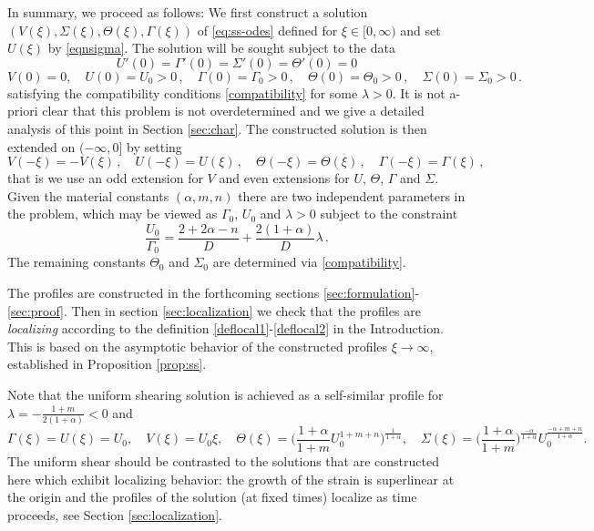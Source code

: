 \documentclass[11pt]{article}
\theoremstyle{remark}
\begin{document}
{In summary, we proceed as follows: We first construct a solution $(V(\xi) , \Sigma(\xi), \Theta(\xi), \Gamma(\xi))$
of \eqref{eq:ss-odes} defined for $\xi \in [0,\infty)$ and set $U(\xi)$ by \eqref{eqnsigma}. The solution will be
sought subject to the data
\begin{equation}
U'(0)=\Gamma'(0)=\Sigma'(0)=\Theta'(0)=0 \label{eq:bdry0}
\end{equation}
\begin{equation}
\label{eq:ic}
V(0) = 0, \quad U(0) = U_0>0 \, , \quad \Gamma (0) = \Gamma_0>0 \, , \quad \Theta (0) = \Theta_0>0 \, , \quad \Sigma (0) = \Sigma_0>0 \, .
\end{equation}
satisfying the compatibility conditions  \eqref{compatibility} for some $\lambda > 0$.
It is not a-priori clear that this problem is not overdetermined and we
give a detailed analysis of this point  in Section \ref{sec:char}.
The constructed solution is then extended on $(-\infty, 0]$ by setting
$$
V(-\xi ) = -V(\xi) \, , \quad U(-\xi) = U(\xi) \, , \quad \Theta (-\xi) = \Theta (\xi) \, , \quad \Gamma (-\xi) = \Gamma (\xi) \, ,
$$
that is we use an odd extension for $V$ and even extensions for  $U$, $\Theta$, $\Gamma$ and $\Sigma$.
Given the material constants $(\alpha, m, n)$ there are two independent parameters in the problem,
which may be viewed as $\Gamma_0$, $U_0$ and $\lambda > 0$ subject to the constraint
\begin{equation}
\label{rate}
\frac{U_0}{\Gamma_0} = \frac{2+2\alpha-n}{D} + \frac{2(1 + \alpha)}{D}\lambda \, .
\end{equation}
The remaining constants $\Theta_0$ and $\Sigma_0$ are determined via \eqref{compatibility}.

The profiles are constructed in the forthcoming sections \ref{sec:formulation}-\ref{sec:proof}. Then in section
\ref{sec:localization} we check that the profiles are {\it localizing} according to the definition \eqref{deflocal1}-\eqref{deflocal2}
in the Introduction. This is based on the asymptotic behavior of the constructed profiles $\xi \to \infty$, established
in Proposition \ref{prop:ss}.
}


Note that the uniform shearing solution is achieved as a self-similar profile for  $\lambda = -\frac{1+m}{2(1+\alpha)}<0$ and
\begin{equation*}
 \Gamma(\xi) = U(\xi)=U_0, \quad V(\xi) = U_0\xi, \quad  \Theta(\xi) = \Big( \frac{1+\alpha}{1+m} U_0^{1+m+n}\Big)^{\frac{1}{1+\alpha}}, \quad \Sigma(\xi) = \Big(\frac{1+\alpha}{1+m}\Big)^{\frac{-\alpha}{1+\alpha}} U_0^{\frac{-\alpha+m+n}{1+\alpha}}.
\end{equation*}
The uniform shear should be contrasted to the solutions that are constructed here which exhibit localizing behavior:
the growth of the strain is superlinear at  the origin and the profiles of the solution (at fixed times) localize  as time proceeds, see Section \ref{sec:localization}.
\end{document}
